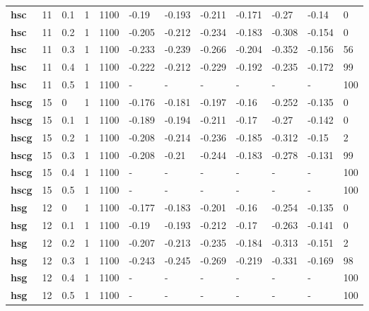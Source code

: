 \begin{longtable}[h]{|p{0.8cm}|p{1.5cm}|p{1cm}|p{1cm}|p{1cm}|p{1cm}|p{1cm}|p{1cm}|p{1cm}|p{1cm}|p{1cm}|p{1.5cm}|}
           \\
  \textbf{hsc } &  11         & 0.1 & 1 & 1100 &  -0.19 & -0.193 & -0.211 & -0.171 &  -0.27 &  -0.14 &   0
           \\
  \textbf{hsc } &  11         & 0.2 & 1 & 1100 & -0.205 & -0.212 & -0.234 & -0.183 & -0.308 & -0.154 &   0
           \\
  \textbf{hsc } &  11         & 0.3 & 1 & 1100 & -0.233 & -0.239 & -0.266 & -0.204 & -0.352 & -0.156 &  56
           \\
  \textbf{hsc } &  11         & 0.4 & 1 & 1100 & -0.222 & -0.212 & -0.229 & -0.192 & -0.235 & -0.172 &  99
           \\
  \textbf{hsc } &  11         & 0.5 & 1 & 1100 & - & - & - & - & - & - & 100
           \\
  \textbf{hscg} &  15         &   0 & 1 & 1100 & -0.176 & -0.181 & -0.197 &  -0.16 & -0.252 & -0.135 &   0
           \\
  \textbf{hscg} &  15         & 0.1 & 1 & 1100 & -0.189 & -0.194 & -0.211 &  -0.17 &  -0.27 & -0.142 &   0
           \\
  \textbf{hscg} &  15         & 0.2 & 1 & 1100 & -0.208 & -0.214 & -0.236 & -0.185 & -0.312 &  -0.15 &   2
           \\
  \textbf{hscg} &  15         & 0.3 & 1 & 1100 & -0.208 &  -0.21 & -0.244 & -0.183 & -0.278 & -0.131 &  99
           \\
  \textbf{hscg} &  15         & 0.4 & 1 & 1100 & - & - & - & - & - & - & 100
           \\
  \textbf{hscg} &  15         & 0.5 & 1 & 1100 & - & - & - & - & - & - & 100
           \\
  \textbf{hsg } &  12         &   0 & 1 & 1100 & -0.177 & -0.183 & -0.201 &  -0.16 & -0.254 & -0.135 &   0
           \\
  \textbf{hsg } &  12         & 0.1 & 1 & 1100 &  -0.19 & -0.193 & -0.212 &  -0.17 & -0.263 & -0.141 &   0
           \\
  \textbf{hsg } &  12         & 0.2 & 1 & 1100 & -0.207 & -0.213 & -0.235 & -0.184 & -0.313 & -0.151 &   2
           \\
  \textbf{hsg } &  12         & 0.3 & 1 & 1100 & -0.243 & -0.245 & -0.269 & -0.219 & -0.331 & -0.169 &  98
           \\
  \textbf{hsg } &  12         & 0.4 & 1 & 1100 & - & - & - & - & - & - & 100
           \\
  \textbf{hsg } &  12         & 0.5 & 1 & 1100 & - & - & - & - & - & - & 100
           \\
 \end{longtable}
